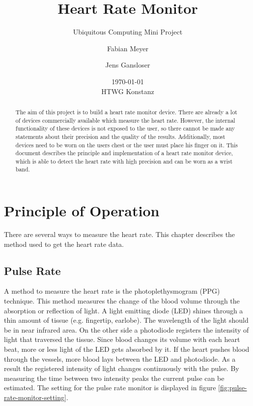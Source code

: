 \documentclass[oneside, notitlepage]{scrreprt}
\begin{document}
\title{Heart Rate Monitor}
\subtitle{Ubiquitous Computing Mini Project}
\author{Fabian Meyer \and Jens Gansloser}
\date{\today \\ HTWG Konstanz}
\maketitle

\begin{abstract}
The aim of this project is to build a heart rate monitor device. There are already a lot of devices commercially available which measure the heart rate. However, the internal functionality of these devices is not exposed to the user, so there cannot be made any statements about their precision and the quality of the results. Additionally, most devices need to be worn on the users chest or the user must place his finger on it. This document describes the principle and implementation of a heart rate monitor device, which is able to detect the heart rate with high precision and can be worn as a wrist band.
\end{abstract}
\clearpage

\tableofcontents

\chapter{Principle of Operation}
\label{chap:principle-of-operation}

There are several ways to measure the heart rate. This chapter describes the method used to get the heart rate data.

\section{Pulse Rate}
\label{sec:pulse-rate}
A method to measure the heart rate is the photoplethysmogram (PPG) technique. This method measures the change of the blood volume through the absorption or reflection of light. A light emitting diode (LED) shines through a thin amount of tissue (e.g. fingertip, earlobe). The wavelength of the light should be in near infrared area. On the other side a photodiode registers the intensity of light that traversed the tissue. Since blood changes its volume with each heart beat, more or less light of the LED gets absorbed by it. If the heart pushes blood through the vessels, more blood lays between the LED and photodiode. As a result the registered intensity of light changes continuously with the pulse. By measuring the time between two intensity peaks the current pulse can be estimated. The setting for the pulse rate monitor is displayed in figure \ref{fig:pulse-rate-monitor-setting}.
\end{document}
